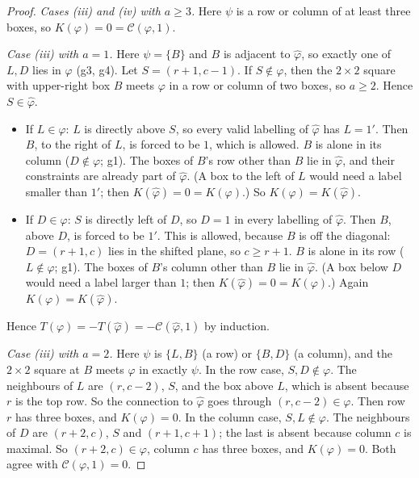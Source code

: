 \documentclass[11pt]{amsart}
\theoremstyle{definition}
\theoremstyle{remark}
\newcommand{\cC}{\mathcal{C}}
\begin{document}
\begin{proof}
\emph{Cases (iii) and (iv) with $a\ge3$.} Here $\psi$ is a row or column of at least three
boxes, so $K(\varphi)=0=\cC(\varphi,1)$.

\emph{Case (iii) with $a=1$.} Here $\psi=\{B\}$ and $B$ is adjacent to $\hat\varphi$, so
exactly one of $L,D$ lies in $\varphi$ (g3, g4). Let $S=(r+1,c-1)$. If $S\notin\varphi$, then
the $2\times2$ square with upper-right box $B$ meets $\varphi$ in a row or column of two boxes,
so $a\ge2$. Hence $S\in\hat\varphi$.
\begin{itemize}
\item If $L\in\varphi$: $L$ is directly above $S$, so every valid labelling of $\hat\varphi$ has
$L=1'$. Then $B$, to the right of $L$, is forced to be $1$, which is allowed. $B$ is alone in
its column ($D\notin\varphi$; g1). The boxes of $B$'s row other than $B$ lie in $\hat\varphi$,
and their constraints are already part of $\hat\varphi$. (A box to the left of $L$ would need a
label smaller than $1'$; then $K(\hat\varphi)=0=K(\varphi)$.) So $K(\varphi)=K(\hat\varphi)$.
\item If $D\in\varphi$: $S$ is directly left of $D$, so $D=1$ in every labelling of
$\hat\varphi$. Then $B$, above $D$, is forced to be $1'$. This is allowed, because $B$ is off
the diagonal: $D=(r+1,c)$ lies in the shifted plane, so $c\ge r+1$. $B$ is alone in its row
($L\notin\varphi$; g1). The boxes of $B$'s column other than $B$ lie in $\hat\varphi$. (A box
below $D$ would need a label larger than $1$; then $K(\hat\varphi)=0=K(\varphi)$.) Again
$K(\varphi)=K(\hat\varphi)$.
\end{itemize}
Hence $T(\varphi)=-T(\hat\varphi)=-\cC(\hat\varphi,1)$ by induction.

\emph{Case (iii) with $a=2$.} Here $\psi$ is $\{L,B\}$ (a row) or $\{B,D\}$ (a column), and the
$2\times2$ square at $B$ meets $\varphi$ in exactly $\psi$. In the row case, $S,D\notin\varphi$.
The neighbours of $L$ are $(r,c-2)$, $S$, and the box above $L$, which is absent because $r$
is the top row. So the connection to $\hat\varphi$ goes through $(r,c-2)\in\varphi$. Then row
$r$ has three boxes, and $K(\varphi)=0$. In the column case, $S,L\notin\varphi$. The neighbours
of $D$ are $(r+2,c)$, $S$ and $(r+1,c+1)$; the last is absent because column $c$ is maximal.
So $(r+2,c)\in\varphi$, column $c$ has three boxes, and $K(\varphi)=0$. Both agree with
$\cC(\varphi,1)=0$.


\end{proof}
\end{document}
